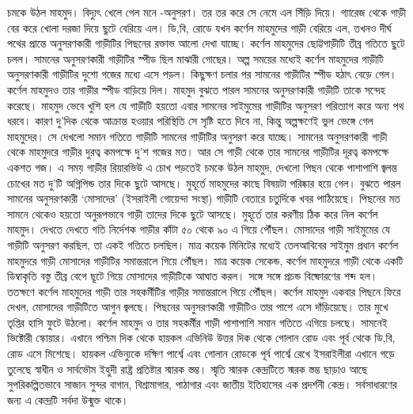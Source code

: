 \documentclass[
]{book}
\begin{document}
চমকে উঠল মাহমুদ। বিদ্যুৎ খেলে গেল মনে -অনুসরণ। তর তর করে সে নেমে এল সিঁড়ি দিয়ে। গ্যারেজ থেকে গাড়ী বের করে খোলা দরজা দিয়ে ছুটে বেরিয়ে এল। ডি,বি, রোডে যখন কর্ণেল মাহমুদের গাড়ী বেরিয়ে এল, তখনও দীর্ঘ পথের প্রান্তে অনুসরণকারী গাড়ীটির পিছনের রক্তাভ আলো দেখা যাচ্ছে। কর্ণেল মাহমুদের ছোট্টগাড়ীটি তীব্র গতিতে ছুটে চলল। সামনের অনুসরণকারী গাড়ীটির স্পীড ছিল মাঝারী গোছের। অল্প সময়ের মধ্যেই কর্ণেল মাহমুদের গাড়ীটি অনুসরণকারী গাড়ীটির দুশো গজের মধ্যে এসে পড়ল। কিছুক্ষণ চলার পর সামনের গাড়ীটির স্পীড হঠাৎ বেড়ে গেল। কর্ণেল মাহমুদও তার গাড়ীর স্পীড বাড়িয়ে দিল। মাহমুদ বুঝতে পারল সামনের অনুসরণকারী গাড়ীটি তাকে সন্দেহ করেছে। মাহমুদ ভেবে খুশি হল যে গাড়ীটি হয়তো এবার সামনের সাইমুমের গাড়ীটির অনুসরণ পরিত্যাগ করে অন্য পথ ধরবে। কারণ দু'দিক থেকে আক্রান্ত হওয়ার পরিস্থিতি সে সৃষ্টি হতে দিবে না, কিন্তু অল্পক্ষণেই ভুল ভেঙ্গে গেল মাহমুদের। সে দেখলো সমান গতিতে গাড়ীটি সামনের গাড়ীটির অনুসরণ করে যাচ্ছে। সামনের অনুসরণকারী গাড়ী থেকে মাহমুদরে গাড়ীর দুরত্ব কমপক্ষে দু'শ গজের মত। আর সে গাড়ী থেকে তার সামনের গাড়ীটির দূরত্ব কমপক্ষে একশত গজ। এ সময় গাড়ীর রিয়ারভিউ এ চোখ পড়তেই চমকে উঠল মাহমুদ, দেখলো পিছন থেকে পাশাপাশি জ্বলন্ত চোখের মত দু'টি অগ্নিপিন্ড তার দিকে ছুটে আসছে। মুহূর্তে মাহমুদের কাছে বিষয়টা পরিষ্কার হয়ে গেল। বুঝতে পারল সামনের অনুসরণকারী `মোসাদের' (ইসরাইলী গোয়েন্দা সংস্থা) গাড়ীটি বেতারে চতুর্দিকে খবর পাঠিয়েছে। পিছনের মত সামনে থেকেও হয়তো অনুরূপভাবে গাড়ী তাদের দিকে ছুটে আসছে। মুহূর্তে তার করণীয় ঠিক করে নিল কর্ণেল মাহমুদ। দেখতে দেখতে গতি নির্দেশক গাড়ীর কাঁটা ৫০ থেকে ৯০ এ গিয়ে পৌঁছল। মোসাদের গাড়ী সাইমুমের যে গাড়ীটি অনুসরণ করছিল, তা একই গতিতে চলছিল। মাত্র কয়েক মিনিটের মধ্যেই তেলআবিবের সাইমুম প্রধান কর্ণেল মাহমুদরে গাড়ী মোসাদের গাড়ীটির সমান্তরালে গিয়ে পৌঁছল। মাত্র কয়েক সেকেন্ড, কর্ণেল মাহমুদরে গাড়ী থেকে একটি ডিম্বাকৃতি বস্তু তীব্র বেগে ছূটে গিয়ে মোসাদের গাড়ীটিকে আঘাত করল। সঙ্গে সঙ্গে প্রচন্ড বিষ্ফোরণের শব্দ হল। ততক্ষণে কর্ণেল মাহমুদের গাড়ী তার সহকর্মীটির গাড়ীর সমান্তরালে গিয়ে পৌঁছল। কর্ণেল মাহমুদ একবার পিছনে ফিরে দেখল, মোসাদের গাড়ীটিতে আগুন জ্বলছে। পিছনের অনুসরণকারী গাড়ীটিও তার পাশে এসে দাঁড়িয়েছে। তার মুখে তৃপ্তির হাসি ফুটে উঠলো। কর্ণেল মাহমুদ ও তার সহকর্মীর গাড়ী পাশাপাশি সমান গতিতে এগিয়ে চলছে। সামনেই ভিক্টোরী স্কোয়ার। এখানে পশ্চিম দিক থেকে হায়কল এভিনিউ উত্তর দিক থেকে গোলান রোড এবং পূর্ব থেকে ডি,বি, রোড এসে মিশেছে। হায়কল এভিন্যুকে দক্ষিণ পার্শ্বে এবং গোলান রোডকে পূর্ব পার্শ্বে রেখে ইসরাইলীরা এখানে গড়ে তুলেছে স্বাধীন ও সার্বভৌম ইহুদী রাষ্ট্র প্রতিষ্টার স্মারক স্তম্ভ। স্মৃতি স্মারক কেন্দ্রটিতে স্মরক স্তম্ভ ছাড়াও আছে সুপরিকল্পিতভাবে সাজান সুন্দর বাগান, বিশ্রামাগার, পাঠাগার এবং জাতীয় ইতিহাসের এক প্রদর্শনী কেন্দ্র। সর্বসাধারণের জন্য এ কেন্দ্রটি সর্বদা উন্মুক্ত থাকে।
\end{document}
